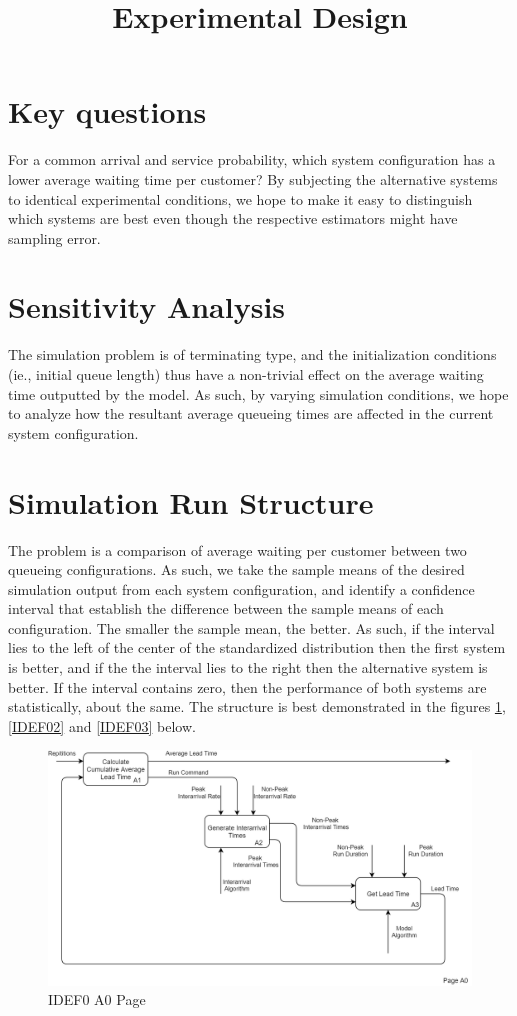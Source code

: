 \documentclass{article}
\begin{document}
\pagecolor{ultramarine}
\title{Experimental Design}
\author{}
\date{}
\maketitle
\section{Key questions}
For a common arrival and service probability, which system configuration has a lower average waiting time per customer? By subjecting the alternative systems to identical experimental conditions, we hope to make it easy to distinguish which systems are best even though the respective estimators might have sampling error.

\section{Sensitivity Analysis}
The simulation problem is of terminating type, and the initialization conditions (ie., initial queue length) thus have a non-trivial effect on the average waiting time outputted by the model. As such, by varying simulation conditions, we hope to analyze how the resultant average queueing times are affected in the current system configuration.

\section{Simulation Run Structure}
The problem is a comparison of average waiting per customer between two queueing configurations. As such, we take the sample means of the desired simulation output from each system configuration, and identify a confidence interval that establish the difference between the sample means of each configuration. The smaller the sample mean, the better. As such, if the interval lies to the left of the center of the standardized distribution then the first system is better, and if the the interval lies to the right then the alternative system is better. If the interval contains zero, then the performance of both systems are statistically, about the same. The structure is best demonstrated in the figures \ref{IDEF01}, \ref{IDEF02} and \ref{IDEF03} below.
\begin{figure}[h]
  \centering
  \includegraphics[scale=0.2]
  {A0.png}
  \caption{IDEF0 A0 Page}
  \label{IDEF01}
\end{figure}
\end{document}
